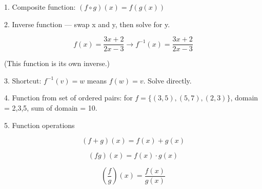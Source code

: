 1. Composite function: $(f \circ g)(x) = f(g(x))$

2. Inverse function — swap x and y, then solve for y.

$$ f(x) = \frac{3x+2}{2x-3} \rightarrow f^{-1}(x) = \frac{3x+2}{2x-3} $$

(This function is its own inverse.)

3. Shortcut: $f^{-1}(v) = w$ means $f(w) = v$. Solve directly.

4. Function from set of ordered pairs: for $f = \{(3,5),(5,7),(2,3)\}$, domain = {2,3,5}, sum of domain = 10.

5. Function operations

$$ (f+g)(x) = f(x)+g(x) $$

$$ (fg)(x) = f(x) \cdot g(x) $$

$$ \left(\frac{f}{g}\right)(x) = \frac{f(x)}{g(x)} $$
